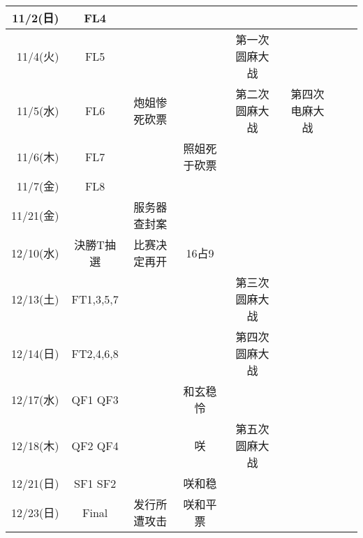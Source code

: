 {\begin{longtable}{rccccccc}
	11/2(日) & FL4 &  &  &  &  &  \\ \hline
	11/4(火) & FL5 &  &  & 第一次圆麻大战 &  &  \\ \hline
	11/5(水) & FL6 & 炮姐惨死砍票 &  & 第二次圆麻大战 & 第四次电麻大战 &  \\ \hline
	11/6(木) & FL7 &  & 照姐死于砍票 &  &  &  \\ \hline
	11/7(金) & FL8 &  &  &  &  &  \\ \hline
	11/21(金) &  & 服务器查封案 &  &  &  &  \\ \hline
	12/10(水) & 決勝T抽選 & 比赛决定再开 & 16占9 &  &  &  \\ \hline
	12/13(土) & FT1,3,5,7 &  &  & 第三次圆麻大战 &  &  \\ \hline
	12/14(日) & FT2,4,6,8 &  &  & 第四次圆麻大战 &  &  \\ \hline
	12/17(水) & QF1 QF3 &  & 和玄稳怜 &  &  &  \\ \hline
	12/18(木) & QF2 QF4 &  & 咲 & 第五次圆麻大战 &  &  \\ \hline
	12/21(日) & SF1 SF2 &  & 咲和稳 &  &  &  \\ \hline
	12/23(日) & Final & 发行所遭攻击 & 咲和平票 &  &  &  \\ \hline
\end{longtable}
}
